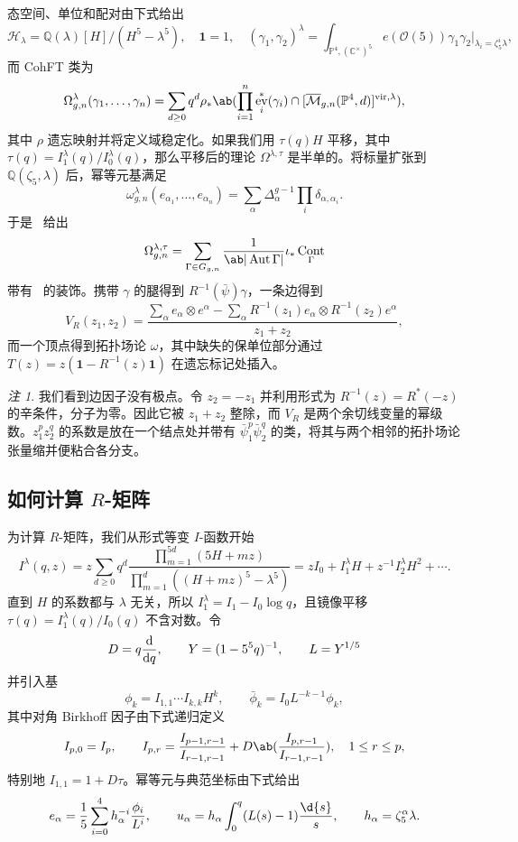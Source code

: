 \documentclass{amsart}
\theoremstyle{definition}
\theoremstyle{remark}
\newtheorem{rmk}[thm]{注}
\theoremstyle{plain}
\theoremstyle{definition}
\theoremstyle{remark}
\newcommand{\C}{\mathbb{C}}
\newcommand{\Q}{\mathbb{Q}}
\renewcommand{\P}{\mathbb{P}}
\newcommand{\Mbar}{\overline{\mathcal{M}}}
\newcommand{\mc}[1]{\mathcal{#1}}
\newcommand{\mr}[1]{\mathrm{#1}}
\newcommand{\1}{\mathbf{1}}
\newcommand{\2}{\mathbf{2}}
\newcommand{\3}{\mathbf{3}}
\newcommand{\vir}{\mr{vir}}
\DeclareMathOperator{\Aut}{Aut}
\DeclareMathOperator{\ev}{ev}
\DeclareMathOperator{\Cont}{Cont}
\begin{document}
态空间、单位和配对由下式给出
\[ \mc{H}_{\lambda} = \Q(\lambda)[H]/(H^5-\lambda^5), \quad \1 = 1, \quad (\gamma_1,\gamma_2)^{\lambda} = \int_{\P^4, (\C^{\times})^5} e(\mc{O}(5))\gamma_1\gamma_2 \Big|_{\lambda_i = \zeta_5^i\lambda}, \]
而 CohFT 类为
\[ \Omega^{\lambda}_{g,n}(\gamma_1, \ldots, \gamma_n) = \sum_{d \geq 0} q^d \rho_* \ab( \prod_{i=1}^n \ev_i^*(\gamma_i) \cap [\Mbar_{g,n}(\P^4,d)]^{\vir,\lambda}), \]
其中 \(\rho\) 遗忘映射并将定义域稳定化。如果我们用 \(\tau(q)H\) 平移，其中 \(\tau(q) = I^{\lambda}_1(q)/I^{\lambda}_0(q)\)，那么平移后的理论 \(\Omega^{\lambda,\tau}\) 是半单的。将标量扩张到 \(\Q(\zeta_5,\lambda)\) 后，幂等元基满足
\[ \omega^{\lambda}_{g,n}(e_{\alpha_1}, \ldots, e_{\alpha_n}) = \sum_{\alpha}\Delta_{\alpha}^{g-1}\prod_i \delta_{\alpha,\alpha_i}. \]
于是~ 给出
\[ \Omega^{\lambda,\tau}_{g,n} = \sum_{\Gamma \in G_{g,n}} \frac{1}{\ab|\Aut\Gamma|}\iota_* \Cont_{\Gamma} \]
带有~ 的装饰。携带 \(\gamma\) 的腿得到 \(R^{-1}(\bar{\psi})\gamma\)，一条边得到
\[ V_R(z_1,z_2) = \frac{\sum_{\alpha} e_{\alpha}\otimes e^{\alpha} - \sum_{\alpha} R^{-1}(z_1)e_{\alpha} \otimes R^{-1}(z_2)e^{\alpha}}{z_1+z_2}, \]
而一个顶点得到拓扑场论 \(\omega\)，其中缺失的保单位部分通过 \(T(z) = z(\1 - R^{-1}(z)\1)\) 在遗忘标记处插入。

\begin{rmk}
    我们看到边因子没有极点。令 \(z_2 = -z_1\) 并利用形式为 \(R^{-1}(z) = R^*(-z)\) 的辛条件，分子为零。因此它被 \(z_1+z_2\) 整除，而 \(V_R\) 是两个余切线变量的幂级数。\(z_1^p z_2^q\) 的系数是放在一个结点处并带有 \(\bar{\psi}_1^p \bar{\psi}_2^q\) 的类，将其与两个相邻的拓扑场论张量缩并便粘合各分支。
\end{rmk}

\subsection{如何计算 \(R\)-矩阵}%
\label{sub:How to compute the R-matrix (Guo)}

为计算 \(R\)-矩阵，我们从形式等变 \(I\)-函数开始
\[ I^{\lambda}(q,z) = z\sum_{d\geq0}q^d \frac{\prod_{m=1}^{5d}(5H+mz)}{\prod_{m=1}^d ((H+mz)^5 - \lambda^5)} = zI_0 + I_1^{\lambda}H + z^{-1}I_2^{\lambda}H^2 + \cdots. \]
直到 \(H\) 的系数都与 \(\lambda\) 无关，所以 \(I_1^{\lambda} = I_1 - I_0 \log q\)，且镜像平移 \(\tau(q) = I_1^{\lambda}(q)/I_0(q)\) 不含对数。令
\[ D = q\odv{}{q}, \qquad Y = (1-5^5q)^{-1}, \qquad L = Y^{1/5} \]
并引入基
\[ \phi_k = I_{1,1}\cdots I_{k,k}H^k, \qquad \bar{\phi}_k = I_0 L^{-k-1}\phi_k, \]
其中对角 Birkhoff 因子由下式递归定义
\[ I_{p,0} = I_p, \qquad I_{p,r} = \frac{I_{p-1,r-1}}{I_{r-1,r-1}} + D \ab( \frac{I_{p,r-1}}{I_{r-1,r-1}}), \quad 1 \leq r \leq p, \]
特别地 \(I_{1,1} = 1+D\tau\)。幂等元与典范坐标由下式给出
\[ e_{\alpha} = \frac{1}{5}\sum_{i=0}^4 h_{\alpha}^{-i}\frac{\phi_i}{L^i}, \qquad u_{\alpha} = h_{\alpha}\int_0^q (L(s)-1)\frac{\d{s}}{s}, \qquad h_{\alpha} = \zeta_5^{\alpha}\lambda. \]
\end{document}
